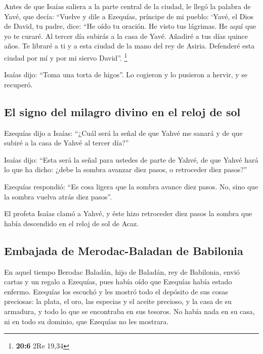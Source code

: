  Antes de que Isaías saliera a la parte central de la
ciudad, le llegó la palabra de Yavé, que decía:  ``Vuelve
y dile a Ezequías, príncipe de mi pueblo: `Yavé, el Dios de David, tu
padre, dice: ``He oído tu oración. He visto tus lágrimas. He aquí que yo
te curaré. Al tercer día subirás a la casa de Yavé. 
Añadiré a tus días quince años. Te libraré a ti y a esta ciudad de la
mano del rey de Asiria. Defenderé esta ciudad por mí y por mi siervo
David''. \footnote{\textbf{20:6} 2Re 19,34}

 Isaías dijo: ``Toma una torta de higos''. Lo cogieron y
lo pusieron a hervir, y se recuperó.

\hypertarget{el-signo-del-milagro-divino-en-el-reloj-de-sol}{%
\subsection{El signo del milagro divino en el reloj de
sol}\label{el-signo-del-milagro-divino-en-el-reloj-de-sol}}

 Ezequías dijo a Isaías: ``¿Cuál será la señal de que
Yahvé me sanará y de que subiré a la casa de Yahvé al tercer día?''

 Isaías dijo: ``Esta será la señal para ustedes de parte
de Yahvé, de que Yahvé hará lo que ha dicho: ¿debe la sombra avanzar
diez pasos, o retroceder diez pasos?''

 Ezequías respondió: ``Es cosa ligera que la sombra
avance diez pasos. No, sino que la sombra vuelva atrás diez pasos''.

 El profeta Isaías clamó a Yahvé, y éste hizo retroceder
diez pasos la sombra que había descendido en el reloj de sol de Acaz.

\hypertarget{embajada-de-merodac-baladan-de-babilonia}{%
\subsection{Embajada de Merodac-Baladan de
Babilonia}\label{embajada-de-merodac-baladan-de-babilonia}}

 En aquel tiempo Berodac Baladán, hijo de Baladán, rey de
Babilonia, envió cartas y un regalo a Ezequías, pues había oído que
Ezequías había estado enfermo.  Ezequías los escuchó y
les mostró todo el depósito de sus cosas preciosas: la plata, el oro,
las especias y el aceite precioso, y la casa de su armadura, y todo lo
que se encontraba en sus tesoros. No había nada en su casa, ni en todo
su dominio, que Ezequías no les mostrara.


